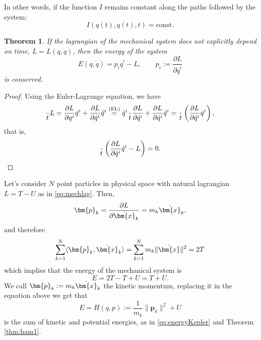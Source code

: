 \documentclass[english,fontsize=11pt,paper=a5,oneside]{scrbook}
\newcommand{\bx}{\bm{x}}
\newcommand{\bp}{\bm{p}}
\newcommand{\lag}{\langle}
\newcommand{\rag}{\rangle}
\let\d\relax
\newcommand{\d}{\mathrm{d}}
\newtheorem{theorem}{Theorem}[chapter]
\theoremstyle{definition}
\newenvironment{example}
  {\pushQED{\qed}\renewcommand{\qedsymbol}{$\lozenge$}\examplex}
  {\popQED\endexamplex}
\begin{document}
In other words, if the function $I$ remains constant along the paths followed by the system:
\begin{equation}
  I(q(t),\dot q(t), t) = \mathrm{const}.
\end{equation}

\begin{theorem}\label{thm:conservationEnergy}
  If the lagrangian of the mechanical system does not explicitly depend on time, $L = L(q, \dot q)$, then the \emph{energy} of the system
  \begin{equation}\label{eq:energy1}
    E(q,\dot q) = p_i \dot q^i - L,\qquad p_i := \frac{\partial L}{\partial \dot q^i}
  \end{equation}
  is conserved.
\end{theorem}
\begin{proof}
  Using the Euler-Lagrange equation, we have
  \begin{equation}
    \frac{\d}{\d t} L
    = \frac{\partial L}{\partial q^i} \dot q^i + \frac{\partial L}{\partial \dot q^i} \ddot q^i
    \overset{\text{(EL)}}{=} \dot q^i \frac{\d}{\d t} \frac{\partial L}{\partial \dot q^i} + \frac{\partial L}{\partial \dot q^i} \ddot q^i
    = \frac{\d}{\d t}\left(\frac{\partial L}{\partial \dot q^i} \dot q^i\right),
  \end{equation}
  that is,
  \begin{equation}
    \frac{\d}{\d t}\left(\frac{\partial L}{\partial \dot q^i} \dot q^i - L\right) = 0.
  \end{equation}
\end{proof}

\begin{example}\label{ex:natlagham}
  Let's consider $N$ point particles in physical space with natural lagrangian $L = T - U$ as in \eqref{eq:mechlag}.
  Then,
  \begin{equation}
    \bp_k = \frac{\partial L}{\partial \dot\bx_k} = m_k \dot \bx_k,
  \end{equation}
  and therefore
  \begin{equation}
    \sum_{k=1}^{N} \lag\bp_k, \dot\bx_k\rag = \sum_{k=1}^{N} m_k \|\dot\bx\|^2 = 2 T
  \end{equation}
  which implies that the energy of the mechanical system is
  \begin{equation}\label{eq:energyFromL}
    E = 2T - T + U = T + U.
  \end{equation}
  We call $\bp_k := m_k \dot \bx_k$ the kinetic momentum, replacing it in the equation above we get that
  \begin{equation}
    E = H(q,p) := \frac{1}{m_k}\|\bp_k\|^2 + U
  \end{equation}
  is the sum of kinetic and potential energies, as in \eqref{eq:energyKepler} and Theorem \ref{thm:ham1}.
\end{example}
\end{document}
